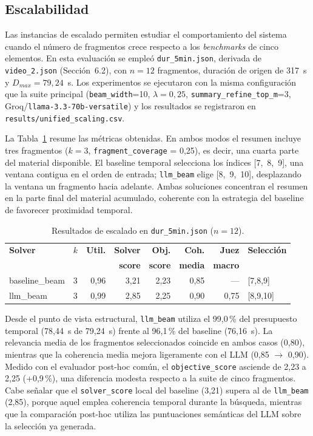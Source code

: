 \documentclass[12pt,a4paper]{article}
\begin{document}
\subsection{Escalabilidad}

Las instancias de escalado permiten estudiar el comportamiento del sistema cuando el número de fragmentos crece respecto a los \textit{benchmarks} de cinco elementos. En esta evaluación se empleó \texttt{dur\_5min.json}, derivada de \texttt{video\_2.json} (Sección~6.2), con \(n=12\) fragmentos, duración de origen de 317~s y \(D_{max}=79{,}24\)~s. Los experimentos se ejecutaron con la misma configuración que la suite principal (\texttt{beam\_width}=10, \(\lambda=0{,}25\), \texttt{summary\_refine\_top\_m}=3, Groq/\texttt{llama-3.3-70b-versatile}) y los resultados se registraron en \texttt{results/unified\_scaling.csv}.

La Tabla~\ref{tab:escalado_resultados} resume las métricas obtenidas. En ambos modos el resumen incluye tres fragmentos (\(k=3\), \texttt{fragment\_coverage} = 0{,}25), es decir, una cuarta parte del material disponible. El baseline temporal selecciona los índices [7,~8,~9], una ventana contigua en el orden de entrada; \texttt{llm\_beam} elige [8,~9,~10], desplazando la ventana un fragmento hacia adelante. Ambas soluciones concentran el resumen en la parte final del material acumulado, coherente con la estrategia del baseline de favorecer proximidad temporal.

\begin{table}[H]
\centering
\caption{Resultados de escalado en \texttt{dur\_5min.json} (\(n=12\)).}
\label{tab:escalado_resultados}
\begin{tabular}{@{}llrrrrrl@{}}
\toprule
\textbf{Solver} & \textbf{\(k\)} & \textbf{Util.} & \textbf{Solver} & \textbf{Obj.} & \textbf{Coh.} & \textbf{Juez} & \textbf{Selección} \\
& & & \textbf{score} & \textbf{score} & \textbf{media} & \textbf{macro} & \\
\midrule
baseline\_beam & 3 & 0{,}96 & 3{,}21 & 2{,}23 & 0{,}85 & --- & [7,8,9] \\
llm\_beam      & 3 & 0{,}99 & 2{,}85 & 2{,}25 & 0{,}90 & 0{,}75 & [8,9,10] \\
\bottomrule
\end{tabular}
\end{table}

Desde el punto de vista estructural, \texttt{llm\_beam} utiliza el 99{,}0\,\% del presupuesto temporal (78{,}44~s de 79{,}24~s) frente al 96{,}1\,\% del baseline (76{,}16~s). La relevancia media de los fragmentos seleccionados coincide en ambos casos (0{,}80), mientras que la coherencia media mejora ligeramente con el LLM (0{,}85 $\rightarrow$ 0{,}90). Medido con el evaluador post-hoc común, el \texttt{objective\_score} asciende de 2{,}23 a 2{,}25 (+0{,}9\,\%), una diferencia modesta respecto a la suite de cinco fragmentos. Cabe señalar que el \texttt{solver\_score} local del baseline (3{,}21) supera al de \texttt{llm\_beam} (2{,}85), porque aquel emplea coherencia temporal durante la búsqueda, mientras que la comparación post-hoc utiliza las puntuaciones semánticas del LLM sobre la selección ya generada.
\end{document}
